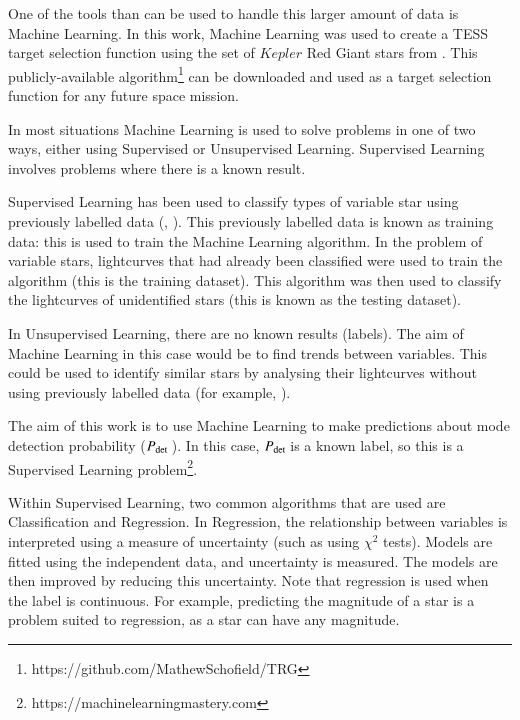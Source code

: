 \documentclass[a4paper,fleqn,usenatbib,useAMS]{mnras}
\newcommand{\pdet}{\ensuremath{P_{\rm det}\:}}
\begin{document}

One of the tools than can be used to handle this larger amount of data is Machine Learning. In this work, Machine Learning was used to create a TESS target selection function using the set of $Kepler$ Red Giant stars from \citet{davies_asteroseismology_2016}. This publicly-available algorithm\footnote{https://github.com/MathewSchofield/TRG} can be downloaded and used as a target selection function for any future space mission.

In most situations Machine Learning is used to solve problems in one of two ways, either using Supervised or Unsupervised Learning. Supervised Learning involves problems where there is a known result. 

Supervised Learning has been used to classify types of variable star using previously labelled data (\citet{nun_supervised_2014}, \citet{elorrieta_machine_2016}). This previously labelled data is known as training data: this is used to train the Machine Learning algorithm. In the problem of variable stars, lightcurves that had already been classified were used to train the algorithm (this is the training dataset). This algorithm was then used to classify the lightcurves of unidentified stars (this is known as the testing dataset).

In Unsupervised Learning, there are no known results (labels). The aim of Machine Learning in this case would be to find trends between variables. This could be used to identify similar stars by analysing their lightcurves without using previously labelled data (for example, \citet{valenzuela_unsupervised_2018}).

The aim of this work is to use Machine Learning to make predictions about mode detection probability (\pdet). In this case, \pdet is a known label, so this is a Supervised Learning problem\footnote{https://machinelearningmastery.com}.

Within Supervised Learning, two common algorithms that are used are Classification and Regression. In Regression, the relationship between variables is interpreted using a measure of uncertainty (such as using $\chi^{2}$ tests). Models are fitted using the independent data, and uncertainty is measured. The models are then improved by reducing this uncertainty. Note that regression is used when the label is continuous. For example, predicting the magnitude of a star is a problem suited to regression, as a star can have any magnitude.
\end{document}
